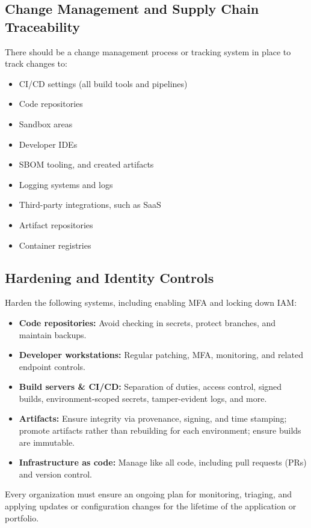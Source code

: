 \documentclass[11pt]{article}
\begin{document}
\subsection{Change Management and Supply Chain Traceability}
There should be a change management process or tracking system in place to track changes to:

\begin{itemize}
  \item CI/CD settings (all build tools and pipelines)
  \item Code repositories
  \item Sandbox areas
  \item Developer IDEs
  \item SBOM tooling, and created artifacts
  \item Logging systems and logs
  \item Third-party integrations, such as SaaS
  \item Artifact repositories
  \item Container registries
\end{itemize}

\subsection{Hardening and Identity Controls}
Harden the following systems, including enabling MFA and locking down IAM:

\begin{itemize}
  \item \textbf{Code repositories:} Avoid checking in secrets, protect branches, and maintain backups.
  \item \textbf{Developer workstations:} Regular patching, MFA, monitoring, and related endpoint controls.
  \item \textbf{Build servers \& CI/CD:} Separation of duties, access control, signed builds, environment-scoped secrets, tamper-evident logs, and more.
  \item \textbf{Artifacts:} Ensure integrity via provenance, signing, and time stamping; promote artifacts rather than rebuilding for each environment; ensure builds are immutable.
  \item \textbf{Infrastructure as code:} Manage like all code, including pull requests (PRs) and version control.
\end{itemize}

\begin{infobox}
Every organization must ensure an ongoing plan for monitoring, triaging, and applying updates or configuration changes for the lifetime of the application or portfolio.
\end{infobox}
\end{document}
